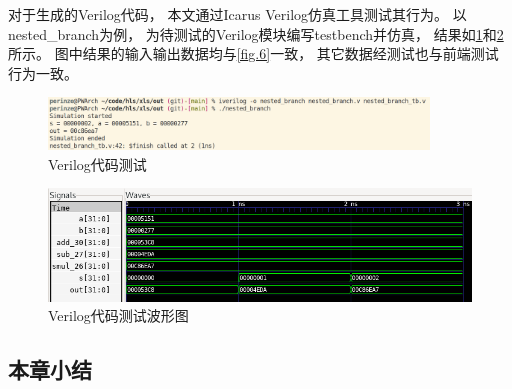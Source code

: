 对于生成的Verilog代码，
本文通过Icarus Verilog仿真工具测试其行为。
以nested\_branch为例，
为待测试的Verilog模块编写testbench并仿真，
结果如\ref{fig.12}和\ref{fig.13}所示。
图中结果的输入输出数据均与\ref{fig.6}一致，
其它数据经测试也与前端测试行为一致。

\begin{figure}[h]
\centering
\includegraphics[width=0.9\textwidth]{figure/verilog_test.png}
\caption{Verilog代码测试}
\label{fig.12}
\end{figure}

\begin{figure}[h]
\centering
\includegraphics{figure/wave.png}
\caption{Verilog代码测试波形图}
\label{fig.13}
\end{figure}

\pagebreak

\subsection{本章小结}